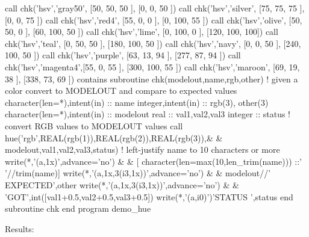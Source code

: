 \begin{DoxyDescription}
\begin{DoxyPre}       call chk('hsv','gray50',  [50,  50,  50 ], [0,   0,   50 ])
       call chk('hsv','silver',  [75,  75,  75 ], [0,   0,   75 ])
       call chk('hsv','red4',    [55,  0,   0  ], [0,   100, 55 ])
       call chk('hsv','olive',   [50,  50,  0  ], [60,  100, 50 ])
       call chk('hsv','lime',    [0,   100, 0  ], [120, 100, 100])
       call chk('hsv','teal',    [0,   50,  50 ], [180, 100, 50 ])
       call chk('hsv','navy',    [0,   0,   50 ], [240, 100, 50 ])
       call chk('hsv','purple',  [63,  13,  94 ], [277, 87,  94 ])
       call chk('hsv','magenta4',[55,  0,   55 ], [300, 100, 55 ])
       call chk('hsv','maroon',  [69,  19,  38 ], [338, 73,  69 ])
    contains
    subroutine chk(modelout,name,rgb,other)
    ! given a color convert to MODELOUT and compare to expected values
    character(len=*),intent(in)   :: name
    integer,intent(in)            :: rgb(3), other(3)
    character(len=*),intent(in)   :: modelout
       real                       :: val1,val2,val3
       integer                    :: status
       ! convert RGB values to MODELOUT values
       call hue('rgb',REAL(rgb(1)),REAL(rgb(2)),REAL(rgb(3)),\&
       \& modelout,val1,val2,val3,status)
          ! left-justify name to 10 characters or more
          write(*,'(a,1x)',advance='no') \&
          \& [ character(len=max(10,len\_trim(name))) ::' '//trim(name)]
          write(*,'(a,1x,3(i3,1x))',advance='no') \&
          \& modelout//' EXPECTED',other
          write(*,'(a,1x,3(i3,1x))',advance='no') \&
          \& 'GOT',int([val1+0.5,val2+0.5,val3+0.5])
          write(*,'(a,i0)')'STATUS ',status
    end subroutine chk
    end program demo\_hue\end{DoxyPre}



\begin{DoxyPre}   Results:\end{DoxyPre}




\end{DoxyDescription}
